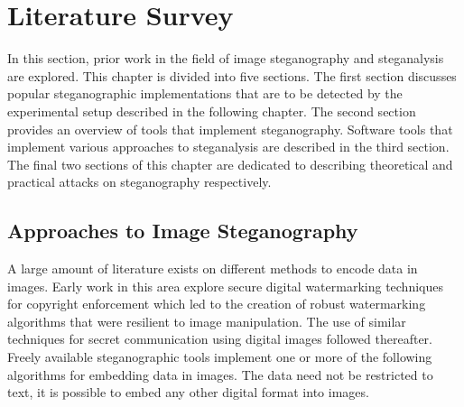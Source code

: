\chapter{Literature Survey}
\label{ch:litsurvey}
In this section, prior work in the field of image steganography and steganalysis are explored. This chapter is divided into five sections. The first section discusses popular steganographic implementations that are to be detected by the experimental setup described in the following chapter. The second section provides an overview of tools that implement steganography. Software tools that implement various approaches to steganalysis are described in the third section. The final two sections of this chapter are dedicated to describing theoretical and practical attacks on steganography respectively.
\section{Approaches to Image Steganography}
\label{sec:overview}
A large amount of literature exists on different methods to encode data in images. Early work in this area explore secure digital watermarking techniques for copyright enforcement which led to the creation of robust watermarking algorithms that were resilient to image manipulation. The use of similar techniques for secret communication using digital images followed thereafter. Freely available steganographic tools implement one or more of the following algorithms for embedding data in images. The data need not be restricted to text, it is possible to embed any other digital format into images. 
